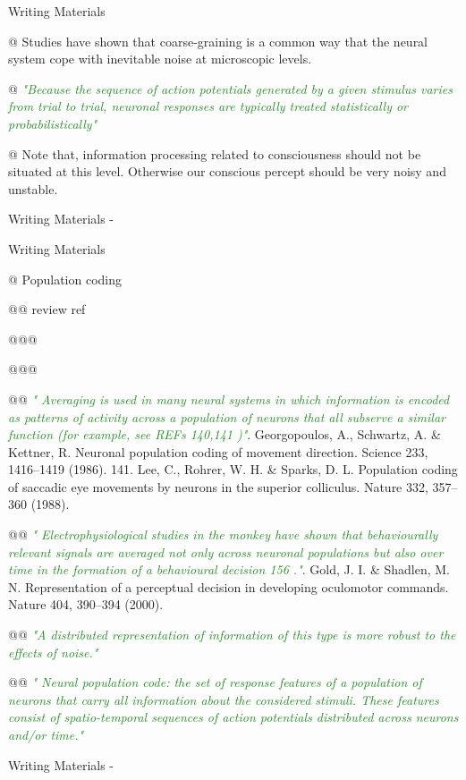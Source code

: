 \documentclass[utf8]{article}
\newenvironment{WritingMaterials} %
    	{
            \begin{tcolorbox}[enhanced,
                title=-,
                size=small,
                colbacktitle=Aquamarine,
                drop fuzzy shadow,
                fontupper=\small,
                boxrule=0.4pt,
                colback=Aquamarine!10!white,
                sharp corners]
                Writing Materials
            \end{tcolorbox}
            \begin{easylist}[itemize]
    	}
    	{
            \end{easylist}  
            \begin{tcolorbox}[enhanced,
                halign=flush right,
                halign title=right,
                size=small,
                colbacktitle=Aquamarine,
                drop fuzzy shadow,
                fontupper=\small,
                boxrule=0.4pt,
                colback=Aquamarine,
                colupper=White,
                sharp corners]
                Writing Materials -
            \end{tcolorbox}        
    	}
\newcommand{\rewrite}[1]{\textcolor{ForestGreen}{\textit{"#1"}}\newline}
\begin{document}
		\begin{WritingMaterials}


			@ Studies have shown that coarse-graining is a common way that the neural system cope with inevitable noise at microscopic levels.

			@ \rewrite{Because the sequence of action potentials generated by a given stimulus varies from trial to trial, neuronal responses are typically treated statistically or probabilistically}


			@ Note that, information processing related to consciousness should not be situated at this level. Otherwise our conscious percept should be very noisy and unstable.

		\end{WritingMaterials}


			\begin{WritingMaterials}
				@ Population coding

					@@ review ref

						@@@ \cite{Stanley2013}

						@@@ \cite{QuianQuiroga2009}

					@@ \rewrite{
						Averaging is used in many neural systems in which information is encoded as patterns of activity across a population of neurons that all subserve a similar function (for example, see REFs 140,141 )}
										140. Georgopoulos, A., Schwartz, A. \& Kettner, R. Neuronal population coding of movement direction. Science 233, 1416–1419 (1986). 141. Lee, C., Rohrer, W. H. \& Sparks, D. L. Population coding of saccadic eye movements by neurons in the superior colliculus. Nature 332, 357–360 (1988).

					@@ \rewrite{
						Electrophysiological studies in the monkey have shown that behaviourally relevant signals are averaged not only across neuronal populations but also over time in the formation of a behavioural decision 156 .} 156. Gold, J. I. \& Shadlen, M. N. Representation of a perceptual decision in developing oculomotor commands. Nature 404, 390–394 (2000).


					@@ \rewrite{A distributed representation of information of this type is more robust to the effects of noise.}



					@@ \rewrite{
						Neural population code: the set of response features of a population of neurons that carry all information about the considered stimuli. These features consist of spatio-temporal sequences of action potentials distributed across neurons and/or time.}


\end{WritingMaterials}
\end{document}
